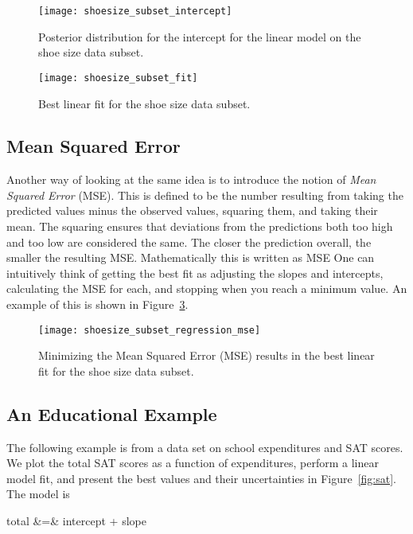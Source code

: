 \begin{figure}
\texttt{[image: shoesize\_subset\_intercept]}
\caption{Posterior distribution for the intercept for the linear model on the shoe size data subset.}\label{fig:shoesize_dist_intercept}
\end{figure}

\begin{figure}
\texttt{[image: shoesize\_subset\_fit]}
\caption{Best linear fit for the shoe size data subset.}\label{fig:shoesize_fit}
\end{figure}


\subsection{Mean Squared Error}

Another way of looking at the same idea is to introduce the notion of \emph{Mean Squared Error} (MSE).  This is defined to be the number resulting from taking the predicted values minus the observed values, squaring them, and taking their mean.  The squaring ensures that deviations from the predictions both too high and too low are considered the same.  The closer the prediction overall, the smaller the resulting MSE.  Mathematically this is written as
\beqn
{\rm MSE} \equiv {}
\eeqn
One can intuitively think of getting the best fit as adjusting the slopes and intercepts, calculating the MSE for each, and stopping when you reach a minimum value.  An example of this is shown in Figure~\ref{fig:shoesize_mse}.

\begin{figure}
\texttt{[image: shoesize\_subset\_regression\_mse]}
\caption{Minimizing the Mean Squared Error (MSE) results in the best linear fit for the shoe size data subset.}\label{fig:shoesize_mse}
\end{figure}


\subsection{An Educational Example}

The following example is from a data set on school expenditures and SAT scores.\cite{guber1999getting}  We plot the total SAT scores as a function of expenditures, perform a linear model fit, and present the best values and their uncertainties in Figure~\ref{fig:sat}.  The model is

\beqn
{\rm total} &=& {\rm intercept} + {\rm slope}
\eeqn

